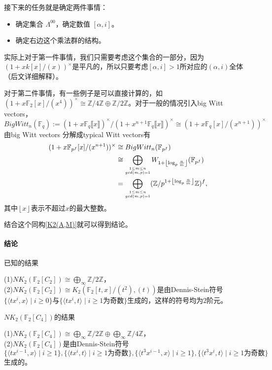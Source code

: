 接下来的任务就是确定两件事情：
\begin{itemize}
	\item 确定集合{\color{blue} $\Lambda^{00}$}，确定数值{\color{blue} $[\alpha,i]$}。
	\item 确定右边这个{\color{blue}乘法群}的结构。
\end{itemize}
实际上对于第一件事情，我们只需要考虑这个集合的一部分，因为$(1+xk[x]/(x))^{\times}$是平凡的，所以只要考虑$[\alpha,i]>1$所对应的$(\alpha,i)$全体（后文详细解释）。

对于第二件事情，有一些例子是可以直接计算的，如$(1+x\mathbb{F}_2[x]/(x^{4}))^{\times}\cong \mathbb{Z}/4 \mathbb{Z} \oplus\mathbb{Z}/2 \mathbb{Z}$。对于一般的情况引入big Witt vectors，
\[BigWitt_n(\mathbb{F}_q):=(1+x \mathbb{F}_q\llbracket x\rrbracket )^{\times}/(1+x^{n+1} \mathbb{F}_q\llbracket x\rrbracket )^{\times} \cong (1+x\mathbb{F}_q[x]/(x^{n+1}))^{\times}\]
由big Witt vectors{\color{blue} 分解成typical Witt vectors}有
\begin{align*}
(1+x\mathbb{F}_{p^f}[x]/(x^{n+1}))^{\times}&\cong BigWitt_n(\mathbb{F}_{p^f}) \\
&\cong \bigoplus_{\scriptsize\substack{1\leq m\leq n \\ gcd(m,p)=1}}W_{1+ \left \lfloor\log_p \frac{n}{m}  \right \rfloor}(\mathbb{F}_{p^f}) \\
& = \bigoplus_{\scriptsize\substack{1\leq m\leq n \\ gcd(m,p)=1}}(\mathbb{Z}/p^{1+ \left \lfloor\log_p \frac{n}{m}  \right \rfloor}\mathbb{Z})^f,
\end{align*}
其中$ \left \lfloor x \right \rfloor$表示不超过$x$的最大整数。

结合这个同构\ref{K2(A,M)}就可以得到结论。

\paragraph{结论} %
\label{par:结论}
已知的结果{\color{gray}
\begin{theorem*}
	(1)$NK_2(\mathbb{F}_2[C_2])\cong \bigoplus_{\infty} \mathbb{Z}/2 \mathbb{Z}$，\\
	(2)$NK_2(\mathbb{F}_2[C_2])\cong K_2(\mathbb{F}_2[t,x]/(t^2),(t))$是由Dennis-Stein符号$\{\langle tx^i,x \rangle \mid i\geq 0\}$与$\{\langle tx^i,t \rangle \mid i\geq 1\text{为奇数}\}$生成的，这样的符号均为$2$阶元。
\end{theorem*}
}
$NK_2(\mathbb{F}_2[C_4])$的结果
{\color{red}\begin{theorem*}
	(1)$NK_2(\mathbb{F}_2[C_4])\cong \bigoplus_{\infty} \mathbb{Z}/2 \mathbb{Z}\oplus \bigoplus_{\infty}\mathbb{Z}/4 \mathbb{Z}$，\\
	(2)$NK_2(\mathbb{F}_2[C_4])$是由Dennis-Stein符号
	\[\{\langle tx^{i-1},x \rangle \mid i\geq 1\},\{\langle tx^i,t \rangle \mid i\geq 1\text{为奇数}\},\{\langle t^3x^{i-1},x \rangle \mid i\geq 1\},%
	\{\langle t^3x^i,t \rangle \mid i\geq 1\text{为奇数}\}\]
	生成的。
\end{theorem*}}

